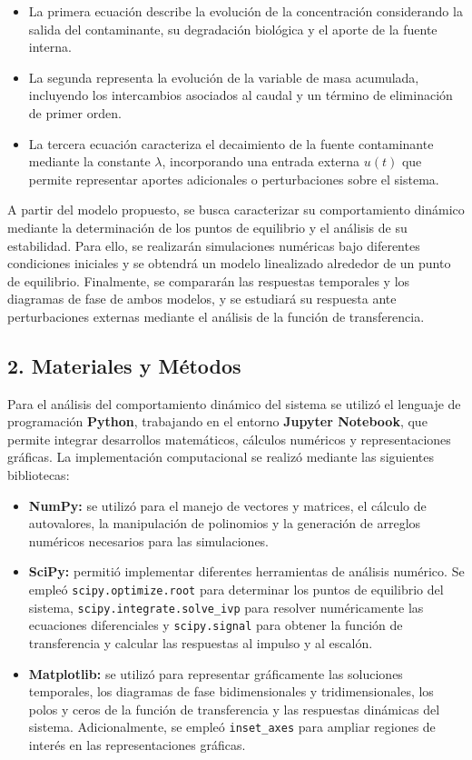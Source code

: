 \documentclass[11pt]{article}
\begin{document}
\begin{itemize}
\item
  La primera ecuación describe la evolución de la concentración
  considerando la salida del contaminante, su degradación biológica y el
  aporte de la fuente interna.
\item
  La segunda representa la evolución de la variable de masa acumulada,
  incluyendo los intercambios asociados al caudal y un término de
  eliminación de primer orden.
\item
  La tercera ecuación caracteriza el decaimiento de la fuente
  contaminante mediante la constante \(\lambda\), incorporando una
  entrada externa \(u(t)\) que permite representar aportes adicionales o
  perturbaciones sobre el sistema.
\end{itemize}

A partir del modelo propuesto, se busca caracterizar su comportamiento
dinámico mediante la determinación de los puntos de equilibrio y el
análisis de su estabilidad. Para ello, se realizarán simulaciones
numéricas bajo diferentes condiciones iniciales y se obtendrá un modelo
linealizado alrededor de un punto de equilibrio. Finalmente, se
compararán las respuestas temporales y los diagramas de fase de ambos
modelos, y se estudiará su respuesta ante perturbaciones externas
mediante el análisis de la función de transferencia.

    \subsection{2. Materiales y Métodos}\label{materiales-y-muxe9todos}

Para el análisis del comportamiento dinámico del sistema se utilizó el
lenguaje de programación \textbf{Python}, trabajando en el entorno
\textbf{Jupyter Notebook}, que permite integrar desarrollos matemáticos,
cálculos numéricos y representaciones gráficas. La implementación
computacional se realizó mediante las siguientes bibliotecas:

\begin{itemize}
\item
  \textbf{NumPy:} se utilizó para el manejo de vectores y matrices, el
  cálculo de autovalores, la manipulación de polinomios y la generación
  de arreglos numéricos necesarios para las simulaciones.
\item
  \textbf{SciPy:} permitió implementar diferentes herramientas de
  análisis numérico. Se empleó \texttt{scipy.optimize.root} para
  determinar los puntos de equilibrio del sistema,
  \texttt{scipy.integrate.solve\_ivp} para resolver numéricamente las
  ecuaciones diferenciales y \texttt{scipy.signal} para obtener la
  función de transferencia y calcular las respuestas al impulso y al
  escalón.
\item
  \textbf{Matplotlib:} se utilizó para representar gráficamente las
  soluciones temporales, los diagramas de fase bidimensionales y
  tridimensionales, los polos y ceros de la función de transferencia y
  las respuestas dinámicas del sistema. Adicionalmente, se empleó
  \texttt{inset\_axes} para ampliar regiones de interés en las
  representaciones gráficas.
\end{itemize}
\end{document}
